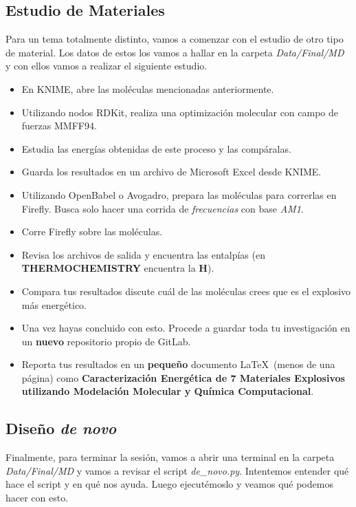 \documentclass[10pt,letterpaper]{article}
\begin{document}
\subsection{Estudio de Materiales}
Para un tema totalmente distinto, vamos a comenzar con el estudio de otro tipo de material. Los datos de estos los vamos a hallar en la carpeta \textit{Data/Final/MD} y con ellos vamos a realizar el siguiente estudio.

\begin{itemize}
\item En KNIME, abre las mol\'eculas mencionadas anteriormente.
\item Utilizando nodos RDKit, realiza una optimizaci\'on molecular con campo de fuerzas MMFF94.
\item Estudia las energ\'ias obtenidas de este proceso y las comp\'aralas.
\item Guarda los resultados en un archivo de Microsoft Excel desde KNIME.
\item Utilizando OpenBabel o Avogadro, prepara las mol\'eculas para correrlas en Firefly. Busca solo hacer una corrida de \emph{frecuencias} con base \emph{AM1}.
\item Corre Firefly sobre las mol\'eculas.
\item Revisa los archivos de salida y encuentra las entalp\'ias (en \textbf{THERMOCHEMISTRY} encuentra la \textbf{H}).
\item Compara tus resultados discute cu\'al de las mol\'eculas crees que es el explosivo m\'as energ\'etico.
\item Una vez hayas concluido con esto. Procede a guardar toda tu investigaci\'on en un \textbf{nuevo} repositorio propio de GitLab.
\item Reporta tus resultados en un \textbf{peque\~no} documento \LaTeX\ (menos de una p\'agina) como \textbf{Caracterizaci\'on Energ\'etica de 7 Materiales Explosivos utilizando Modelaci\'on Molecular y Qu\'imica Computacional}.
\end{itemize}

\subsection{Dise\~no \emph{de novo}}
Finalmente, para terminar la sesi\'on, vamos a abrir una terminal en la carpeta \textit{Data/Final/MD} y vamos a revisar el script \textit{de\_novo.py}. Intentemos entender qu\'e hace el script y en qu\'e nos ayuda. Luego ejecut\'emoslo y veamos qu\'e podemos hacer con esto.
\end{document}
